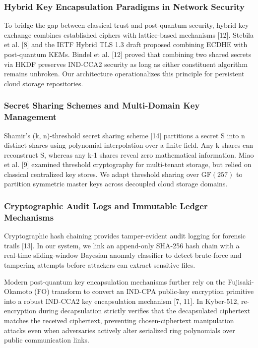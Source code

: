 \documentclass[5p,times]{elsarticle}
\begin{document}
\subsubsection{Hybrid Key Encapsulation Paradigms in Network Security}

To bridge the gap between classical trust and post-quantum security, hybrid key exchange combines established ciphers with lattice-based mechanisms [12]. Stebila et al. [8] and the IETF Hybrid TLS 1.3 draft proposed combining ECDHE with post-quantum KEMs. Bindel et al. [12] proved that combining two shared secrets via HKDF preserves IND-CCA2 security as long as either constituent algorithm remains unbroken. Our architecture operationalizes this principle for persistent cloud storage repositories.


\subsubsection{Secret Sharing Schemes and Multi-Domain Key Management}

Shamir's (k, n)-threshold secret sharing scheme [14] partitions a secret S into n distinct shares using polynomial interpolation over a finite field. Any k shares can reconstruct S, whereas any k-1 shares reveal zero mathematical information. Miao et al. [9] examined threshold cryptography for multi-tenant storage, but relied on classical centralized key stores. We adapt threshold sharing over $\text{GF}(257)$ to partition symmetric master keys across decoupled cloud storage domains.


\subsubsection{Cryptographic Audit Logs and Immutable Ledger Mechanisms}

Cryptographic hash chaining provides tamper-evident audit logging for forensic trails [13]. In our system, we link an append-only SHA-256 hash chain with a real-time sliding-window Bayesian anomaly classifier to detect brute-force and tampering attempts before attackers can extract sensitive files.

Modern post-quantum key encapsulation mechanisms further rely on the Fujisaki-Okamoto (FO) transform to convert an IND-CPA public-key encryption primitive into a robust IND-CCA2 key encapsulation mechanism [7, 11]. In Kyber-512, re-encryption during decapsulation strictly verifies that the decapsulated ciphertext matches the received ciphertext, preventing chosen-ciphertext manipulation attacks even when adversaries actively alter serialized ring polynomials over public communication links.
\end{document}
